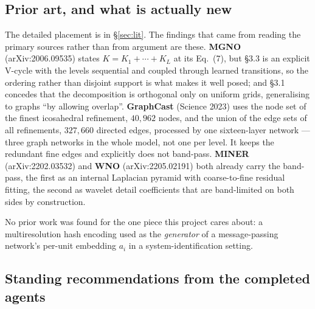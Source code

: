 \documentclass[11pt,a4paper]{article}
\begin{document}
\subsection{Prior art, and what is actually new}

The detailed placement is in \S\ref{sec:lit}. The findings that came from reading the primary sources
rather than from argument are these. \textbf{MGNO} (arXiv:2006.09535) states
$K = K_1 + \cdots + K_L$ at its Eq.~(7), but \S3.3 is an explicit V-cycle with the levels
sequential and coupled through learned transitions, so the ordering rather than disjoint
support is what makes it well posed; and \S3.1 concedes that the decomposition is orthogonal
only on uniform grids, generalising to graphs ``by allowing overlap''. \textbf{GraphCast}
(Science 2023) uses the node set of the finest icosahedral refinement, $40{,}962$ nodes, and
the union of the edge sets of all refinements, $327{,}660$ directed edges, processed by one
sixteen-layer network --- three graph networks in the whole model, not one per level. It
keeps the redundant fine edges and explicitly does not band-pass. \textbf{MINER}
(arXiv:2202.03532) and \textbf{WNO} (arXiv:2205.02191) both already carry the band-pass, the
first as an internal Laplacian pyramid with coarse-to-fine residual fitting, the second as
wavelet detail coefficients that are band-limited on both sides by construction.

No prior work was found for the one piece this project cares about: a multiresolution hash
encoding used as the \emph{generator} of a message-passing network's per-unit embedding
$a_i$ in a system-identification setting.

\subsection{Standing recommendations from the completed agents}
\end{document}
